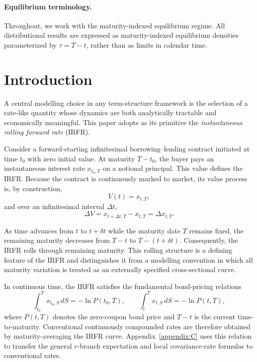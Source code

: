 \documentclass[12pt]{article}
\theoremstyle{statementstyle}
\begin{document}

\paragraph{Equilibrium terminology.}
Throughout, we work with the maturity-indexed equilibrium regime. All distributional results are expressed as maturity-indexed equilibrium densities parameterized by $\tau = T-t$, rather than as limits in calendar time.

\section{Introduction}
\label{sec:introduction}

A central modelling choice in any term-structure framework is the
selection of a rate-like quantity whose dynamics are both analytically
tractable and economically meaningful. This paper adopts as its
primitive the \emph{instantaneous rolling forward rate} (IRFR).

Consider a forward-starting infinitesimal borrowing--lending contract
initiated at time $t_{0}$ with zero initial value. At maturity
$T-t_{0}$, the buyer pays an instantaneous interest rate
$x_{t_{0},T}$ on a notional principal. This value defines the IRFR.
Because the contract is continuously marked to market, its value
process is, by construction,
\[
V(t)=x_{t,T},
\]
and over an infinitesimal interval $\Delta t$,
\[
\Delta V=x_{t+\Delta t,T}-x_{t,T}=\Delta x_{t,T}.
\]

As time advances from $t$ to $t+\delta t$ while the maturity date $T$
remains fixed, the remaining maturity decreases from $T-t$ to
$T-(t+\delta t)$. Consequently, the IRFR rolls through remaining
maturity. This rolling structure is a defining feature of the IRFR and
distinguishes it from a modelling convention in which all maturity
variation is treated as an externally specified cross-sectional curve.

In continuous time, the IRFR satisfies the fundamental bond-pricing
relations
\[
\int_{t_{0}}^{T}x_{t_{0},S}\,dS=-\ln P(t_{0},T),
\qquad
\int_{t}^{T}x_{t,S}\,dS=-\ln P(t,T),
\]
where $P(t,T)$ denotes the zero-coupon bond price and $T-t$ is the
current time-to-maturity. Conventional continuously compounded rates are
therefore obtained by maturity-averaging the IRFR curve. Appendix~\ref{appendix:C}
uses this relation to transfer the general $r$-branch expectation and
local covariance-rate formulas to conventional rates.
\end{document}
